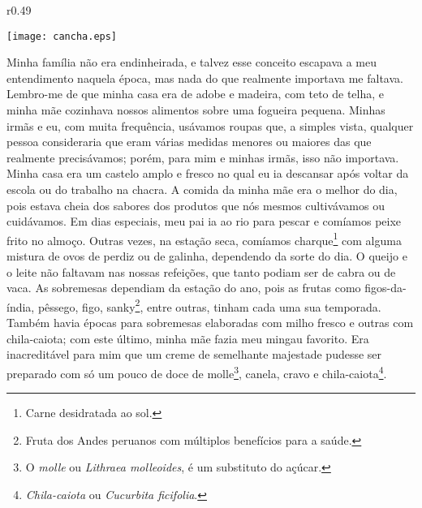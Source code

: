 \ifdefined\EnableIncludeImages
\begin{wrapfigure}{r}{0.49\textwidth}
  \begin{center}
  \vspace{-20pt}
    \texttt{[image: cancha.eps]}
  \end{center}
  \vspace{-20pt}
\end{wrapfigure}
\fi
Minha família não era endinheirada, e talvez esse conceito escapava a meu entendimento naquela época, mas nada do que realmente importava me faltava.
Lembro-me de que minha casa era de adobe e madeira, com teto de telha, e minha mãe cozinhava nossos alimentos sobre uma fogueira pequena. Minhas irmãs e eu, com muita frequência, usávamos roupas que, a simples vista, qualquer pessoa consideraria que eram várias medidas menores ou maiores das que realmente precisávamos;
porém, para mim e minhas irmãs, isso não importava. Minha casa era um castelo amplo e fresco no qual eu ia descansar após voltar da escola ou do trabalho na chacra. 
A comida da minha mãe era o melhor do dia, pois estava cheia dos sabores dos produtos que nós mesmos cultivávamos ou cuidávamos. 
Em dias especiais, meu pai ia ao rio para pescar e comíamos peixe frito no almoço. Outras vezes, na estação seca, comíamos charque\footnote{Carne desidratada ao sol.} com alguma mistura de ovos de perdiz ou de galinha, dependendo da sorte do dia.
O queijo e o leite não faltavam nas nossas refeições, que tanto podiam ser de cabra ou de vaca.
As sobremesas dependiam da estação do ano, pois as frutas como figos-da-índia, pêssego, figo, sanky\footnote{Fruta dos Andes peruanos com múltiplos benefícios para a saúde.}, entre outras, tinham cada uma sua temporada. Também havia épocas para sobremesas elaboradas com milho fresco e outras com chila-caiota; com este último, minha mãe fazia meu mingau favorito. Era inacreditável para mim que um creme de semelhante majestade pudesse ser preparado com só um pouco de doce de molle\footnote{O \textit{molle} ou \textit{Lithraea molleoides}, é um substituto do açúcar.}, canela, cravo e chila-caiota\footnote{\textit{Chila-caiota} ou \textit{Cucurbita ficifolia}.}.


